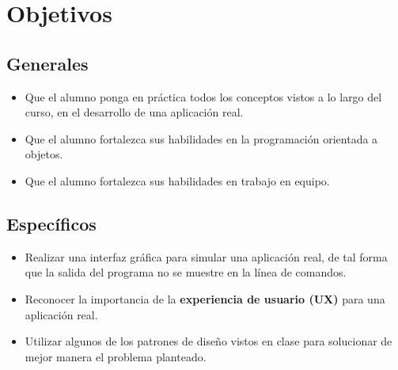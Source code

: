 \section*{Objetivos}

\subsection*{Generales}

\begin{itemize}
  \item Que el alumno ponga en práctica todos los conceptos vistos a lo largo 
  del curso, en el desarrollo de una aplicación real.
  \item Que el alumno fortalezca sus habilidades en la programación orientada 
  a objetos.
  \item Que el alumno fortalezca sus habilidades en trabajo en equipo.
\end{itemize}

\subsection*{Específicos}

\begin{itemize}
  \item Realizar una interfaz gráfica para simular una aplicación real, de tal 
  forma que la salida del programa no se muestre en la línea de comandos.
  \item Reconocer la importancia de la \textbf{experiencia de usuario (UX)} 
  para una aplicación real.
  \item Utilizar algunos de los patrones de diseño vistos en clase para 
  solucionar de mejor manera el problema planteado.
\end{itemize}

\pagebreak
